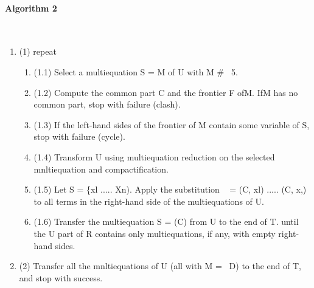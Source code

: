 \paragraph{Algorithm 2}\ \\
\begin{enumerate}
  \item 
(1) repeat
\begin{enumerate}
  \item 
(1.1) Select a multiequation S = M of U with M \# ~5.
  \item 
(1.2) Compute the common part C and the frontier F ofM. IfM has no common part,
stop with failure (clash).
  \item 
(1.3) If the left-hand sides of the frontier of M contain some variable of S, stop with
failure (cycle).
  \item 
(1.4) Transform U using multiequation reduction on the selected mnltiequation and
compactification.
  \item 
(1.5) Let S = \{xl ..... Xn). Apply the substitution ~ = {(C, xl) ..... (C, x,)}
to all terms in the right-hand side of the multiequations of U.
  \item 
(1.6) Transfer the multiequation S = (C) from U to the end of T.
until the U part of R contains only multiequations, if any, with empty right-hand
sides.
\end{enumerate}
  \item 
(2) Transfer all the mnltiequations of U (all with M = ~D) to the end of T, and stop with
success. 
\end{enumerate}
 
